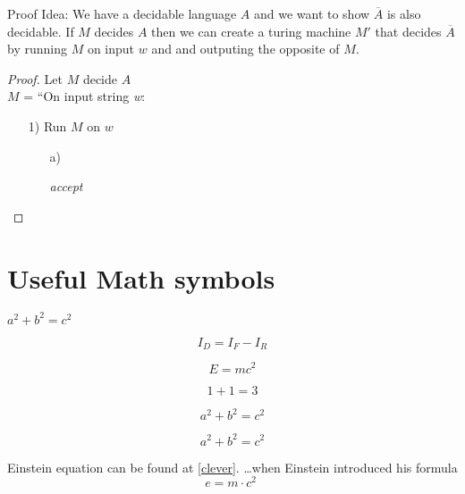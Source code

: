 \documentclass{article}
\begin{document}
Proof Idea: We have a decidable language $A$ and we want to show $\overline{A}$ is also decidable. If $M$ decides $A$ then we can create a turing machine $M'$ that decides $\overline{A}$ by running $M$ on input $w$ and and outputing the opposite of $M$.

\begin{proof}
Let $M$ decide  $A$
\\
 $M$ = ``On input string \emph{w}: 
\begin{enumerate}
\item[1)] Run $M$ on $w$
\begin{enumerate}
\item[a)] 
 \begin{algorithmic}
	\State \emph{accept}
\EndIf
\end{algorithmic}
\end{enumerate}
\end{enumerate}
\end{proof}

\section{Useful Math symbols}

$a^2 + b^2 = c^2$

\begin{equation}
I_D = I_F - I_R
\end{equation}

\begin{equation}
   E = mc^2 \label{clever}
 \end{equation}

\begin{equation}
  1 + 1 = 3 
 \end{equation}

\begin{equation}
  a^2 + b^2 = c^2
 \end{equation}

\begin{equation*}
  a^2 + b^2 = c^2
 \end{equation*}

Einstein equation can be found at \eqref{clever}.
\newline
\newline
\ldots when Einstein introduced his formula
\begin{equation}
e = m \cdot c^2 \;
\label{Einstein equation}
\end{equation}
\end{document}
